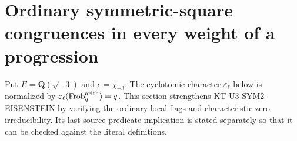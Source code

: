 \documentclass[11pt,a4paper]{article}
\theoremstyle{definition}
\begin{document}


\section{Ordinary symmetric-square congruences in every weight of a progression}
\label{sec:kt-ordinary-symmetric-square}

Put $E=\mathbf Q(\sqrt{-3})$ and $\epsilon=\chi_{-3}$.
The cyclotomic character $\varepsilon_\ell$ below is normalized
by $\varepsilon_\ell(\operatorname{Frob}^{\rm arith}_q)=q$.
This section strengthens KT-U3-SYM2-EISENSTEIN by verifying
the ordinary local flags and characteristic-zero irreducibility.
Its last source-predicate implication is stated separately so
that it can be checked against the literal definitions.
\end{document}
